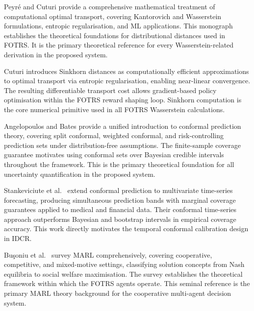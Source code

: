 \documentclass[12pt,a4paper,oneside]{report}
\theoremstyle{definition}
\theoremstyle{remark}
\begin{document}
\noindent Peyr\'{e} and Cuturi \cite{Peyre2019OT} provide a comprehensive mathematical treatment of computational optimal transport, covering Kantorovich and Wasserstein formulations, entropic regularisation, and ML applications. This monograph establishes the theoretical foundations for distributional distances used in FOTRS. It is the primary theoretical reference for every Wasserstein-related derivation in the proposed system.

\medskip

\noindent Cuturi \cite{Cuturi2013Sinkhorn} introduces Sinkhorn distances as computationally efficient approximations to optimal transport via entropic regularisation, enabling near-linear convergence. The resulting differentiable transport cost allows gradient-based policy optimisation within the FOTRS reward shaping loop. Sinkhorn computation is the core numerical primitive used in all FOTRS Wasserstein calculations.

\medskip

\noindent Angelopoulos and Bates \cite{Angelopoulos2023CP} provide a unified introduction to conformal prediction theory, covering split conformal, weighted conformal, and risk-controlling prediction sets under distribution-free assumptions. The finite-sample coverage guarantee motivates using conformal sets over Bayesian credible intervals throughout the framework. This is the primary theoretical foundation for all uncertainty quantification in the proposed system.

\medskip

\noindent Stankeviciute et al.\ \cite{Stankeviciute2021CPTS} extend conformal prediction to multivariate time-series forecasting, producing simultaneous prediction bands with marginal coverage guarantees applied to medical and financial data. Their conformal time-series approach outperforms Bayesian and bootstrap intervals in empirical coverage accuracy. This work directly motivates the temporal conformal calibration design in IDCR.

\medskip

\noindent Bu\c{s}oniu et al.\ \cite{Busoniu2008MARL} survey MARL comprehensively, covering cooperative, competitive, and mixed-motive settings, classifying solution concepts from Nash equilibria to social welfare maximisation. The survey establishes the theoretical framework within which the FOTRS agents operate. This seminal reference is the primary MARL theory background for the cooperative multi-agent decision system.

\medskip
\end{document}
